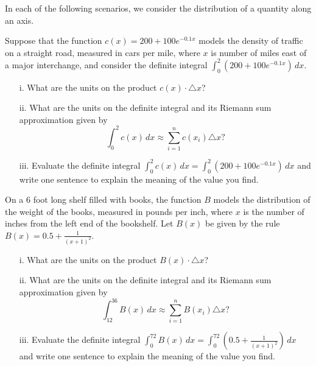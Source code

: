 \begin{pa} \label{PA:6.3}  In each of the following scenarios, we consider the distribution of a quantity along an axis.

\ba
	\item Suppose that the function $c(x) = 200 + 100 e^{-0.1x}$ models the density of traffic on a straight road, measured in cars per mile, where $x$ is number of miles east of a major interchange, and consider the definite integral $\int_0^2 (200 + 100 e^{-0.1x}) \, dx$.
	\begin{itemize}
		\item[i.] What are the units on the product $c(x) \cdot \triangle x$?
		\item[ii.] What are the units on the definite integral and its Riemann sum approximation given by
		$$\int_0^2 c(x) \, dx \approx \sum_{i=1}^n c(x_i) \triangle x?$$
		\item[iii.] Evaluate the definite integral $\int_0^2 c(x) \, dx = \int_0^2 (200 + 100 e^{-0.1x}) \, dx$ and write one sentence to explain the meaning of the value you find.
	\end{itemize}
	\item On a 6 foot long shelf filled with books, the function $B$ models the distribution of the weight of the books, measured in pounds per inch, where $x$ is the number of inches from the left end of the bookshelf.  Let $B(x)$ be given by the rule $B(x) = 0.5 + \frac{1}{(x+1)^2}$.
	\begin{itemize}
		\item[i.] What are the units on the product $B(x) \cdot \triangle x$?
		\item[ii.] What are the units on the definite integral and its Riemann sum approximation given by
		$$\int_{12}^{36} B(x) \, dx \approx \sum_{i=1}^n B(x_i) \triangle x?$$
		\item[iii.] Evaluate the definite integral $\int_{0}^{72} B(x) \, dx = \int_0^{72} (0.5 + \frac{1}{(x+1)^2}) \, dx$ and write one sentence to explain the meaning of the value you find.
	\end{itemize}
\ea
\end{pa} 
\afterpa